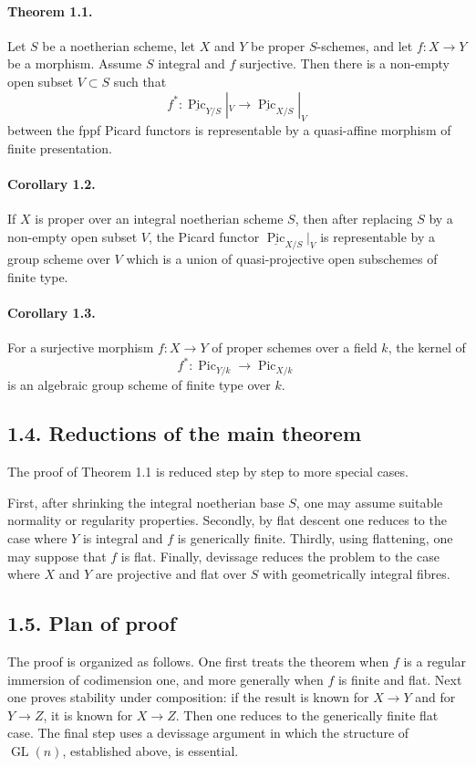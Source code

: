 \documentclass[11pt]{article}
\theoremstyle{plain}
\theoremstyle{definition}
\theoremstyle{remark}
\DeclareMathOperator{\Pic}{Pic}
\newcommand{\longto}{\longrightarrow}
\providecommand{\Gl}{\operatorname{GL}}
\begin{document}
\paragraph{Theorem 1.1.}
Let $S$ be a noetherian scheme, let $X$ and $Y$ be proper $S$-schemes, and let $f:X\to Y$ be a morphism. Assume $S$ integral and $f$ surjective. Then there is a non-empty open subset $V\subset S$ such that
\[
f^*:\underline{\Pic}_{Y/S}|_V\longto \underline{\Pic}_{X/S}|_V
\]
between the fppf Picard functors is representable by a quasi-affine morphism of finite presentation.

\paragraph{Corollary 1.2.}
If $X$ is proper over an integral noetherian scheme $S$, then after replacing $S$ by a non-empty open subset $V$, the Picard functor $\underline{\Pic}_{X/S}|_V$ is representable by a group scheme over $V$ which is a union of quasi-projective open subschemes of finite type.

\paragraph{Corollary 1.3.}
For a surjective morphism $f:X\to Y$ of proper schemes over a field $k$, the kernel of
\[
f^*:\Pic_{Y/k}\longto\Pic_{X/k}
\]
is an algebraic group scheme of finite type over $k$.

\subsection*{1.4. Reductions of the main theorem}

The proof of Theorem 1.1 is reduced step by step to more special cases.

First, after shrinking the integral noetherian base $S$, one may assume suitable normality or regularity properties. Secondly, by flat descent one reduces to the case where $Y$ is integral and $f$ is generically finite. Thirdly, using flattening, one may suppose that $f$ is flat. Finally, devissage reduces the problem to the case where $X$ and $Y$ are projective and flat over $S$ with geometrically integral fibres.

\subsection*{1.5. Plan of proof}

The proof is organized as follows. One first treats the theorem when $f$ is a regular immersion of codimension one, and more generally when $f$ is finite and flat. Next one proves stability under composition: if the result is known for $X\to Y$ and for $Y\to Z$, it is known for $X\to Z$. Then one reduces to the generically finite flat case. The final step uses a devissage argument in which the structure of $\Gl(n)$, established above, is essential.
\end{document}
